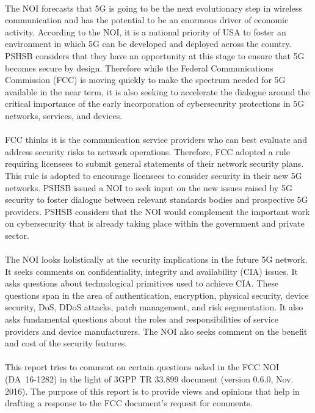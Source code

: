 \documentclass[lnicst,sechang,a4paper]{svmultln}
\begin{document}
\paragraph{}
The NOI forecasts that 5G is going to be the next evolutionary step in wireless communication and has the potential to be an enormous driver of economic activity. According to the NOI, it is a national priority of USA to foster an environment in which 5G can be developed and deployed across the country. PSHSB considers that they have an opportunity at this stage to ensure that 5G becomes secure by design. Therefore while the Federal Communications Commission (FCC) is moving quickly to make the spectrum needed for 5G available in the near term, it is also seeking to accelerate the dialogue around the critical importance of the early incorporation of cybersecurity protections in 5G networks, services, and devices.
\paragraph{}
FCC thinks it is the communication service providers who can best evaluate and address security risks to network operations. Therefore, FCC adopted a rule requiring licensees to submit general statements of their network security plans. This rule is adopted to encourage licensees to consider security in their new 5G networks. PSHSB issued a NOI to seek input on the new issues raised by 5G security to foster dialogue between relevant standards bodies and prospective 5G providers. PSHSB considers that the NOI would complement the important work on cybersecurity that is already taking place within the government and private sector.
\paragraph{}
The NOI looks holistically at the security implications in the future 5G network. It seeks comments on confidentiality, integrity and availability (CIA) issues. It asks questions about technological primitives used to achieve CIA. These questions span in the area of authentication, encryption, physical security, device security, DoS, DDoS attacks, patch management, and risk segmentation. It also asks fundamental questions about the roles and responsibilities of service providers and device manufacturers. The NOI also seeks comment on the benefit and cost of the security features.
\paragraph{}
This report tries to comment on certain questions asked in the FCC NOI (DA~16-1282) in the light of 3GPP TR 33.899 document (version 0.6.0, Nov. 2016). The purpose of this report is to provide views and opinions that help in drafting a response to the FCC document's request for comments.
\end{document}
